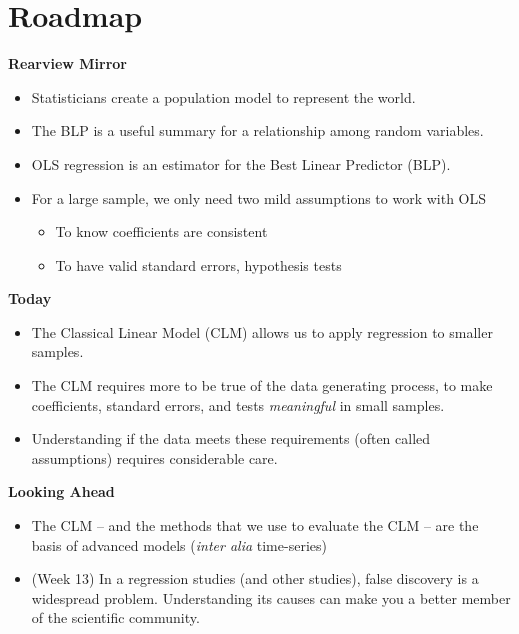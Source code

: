\documentclass[
]{book}
\providecommand{\tightlist}{%
  \setlength{\itemsep}{0pt}\setlength{\parskip}{0pt}}
\theoremstyle{definition}
\theoremstyle{definition}
\theoremstyle{definition}
\theoremstyle{definition}
\theoremstyle{remark}
\begin{document}
\section{Roadmap}\label{roadmap-8}

\textbf{Rearview Mirror}

\begin{itemize}
\tightlist
\item
  Statisticians create a population model to represent the world.
\item
  The BLP is a useful summary for a relationship among random variables.
\item
  OLS regression is an estimator for the Best Linear Predictor (BLP).
\item
  For a large sample, we only need two mild assumptions to work with OLS

  \begin{itemize}
  \tightlist
  \item
    To know coefficients are consistent
  \item
    To have valid standard errors, hypothesis tests
  \end{itemize}
\end{itemize}

\textbf{Today}

\begin{itemize}
\tightlist
\item
  The Classical Linear Model (CLM) allows us to apply regression to smaller samples.
\item
  The CLM requires more to be true of the data generating process, to make coefficients, standard errors, and tests \emph{meaningful} in small samples.
\item
  Understanding if the data meets these requirements (often called assumptions) requires considerable care.
\end{itemize}

\textbf{Looking Ahead}

\begin{itemize}
\tightlist
\item
  The CLM -- and the methods that we use to evaluate the CLM -- are the basis of advanced models (\emph{inter alia} time-series)
\item
  (Week 13) In a regression studies (and other studies), false discovery is a widespread problem. Understanding its causes can make you a better member of the scientific community.
\end{itemize}
\end{document}
